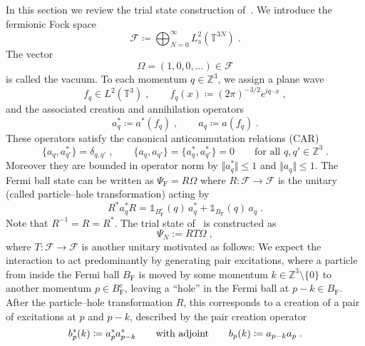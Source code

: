 \documentclass[12pt,a4paper]{article}
\numberwithin{equation}{section}
\newcommand{\cF}{\mathcal{F}}
\newcommand{\TTT}{\mathbb{T}}
\newcommand{\ZZZ}{\mathbb{Z}}
\newcommand{\1}{\mathbb{I}}
\newcommand{\F}{\mathrm{F}}
\newcommand{\FS}{\mathrm{F}}
\newcommand{\Z}{\mathbb{Z}}
\newcommand{\T}{\mathbb{T}}
\theoremstyle{plain}
\theoremstyle{definition}
\theoremstyle{remark}
\theoremstyle{plain}
\theoremstyle{definition}
\theoremstyle{remark}
\begin{document}
In this section we review the trial state construction of~\cite{CHN23}. We introduce the fermionic Fock space
\begin{equation}
	\cF \coloneq \bigoplus_{N=0}^\infty L^2_{\mathrm{a}}(\T^{3N}) \;.
\end{equation}
The vector
\begin{equation}
\Omega = (1,0,0,\ldots) \in \cF
\end{equation}
is called the vacuum. To each momentum $ q \in \ZZZ^3 $, we assign a plane wave
\begin{equation}
	f_q \in L^2(\TTT^3) \;, \qquad
	f_q(x) \coloneq (2 \pi)^{-3/2} e^{i q \cdot x} \;,
\end{equation}
and the associated creation and annihilation operators
\begin{equation}
	a^*_q \coloneq a^*(f_q) \;, \qquad
	a_q \coloneq a(f_q) \;.
\end{equation}
These operators satisfy the canonical anticommutation relations (CAR)
\begin{equation} \label{eq:CAR}
	\{a_q, a_{q'}^*\} = \delta_{q, q'} \;, \qquad
	\{a_q, a_{q'}\} = \{a_q^*, a_{q'}^*\} = 0 \qquad \text{for all } q, q' \in \ZZZ^3\;.
\end{equation}
Moreover they are bounded in operator norm by $ \Vert a_q^* \Vert \leq 1$ and $\Vert a_q \Vert \le 1 $.
The Fermi ball state can be written as $ \Psi_{\FS} = R \Omega $ where $ R: \cF \to \cF $ is the unitary (called particle--hole transformation) acting by
\begin{equation} \label{eq:R}
	R^* a_q^* R 	= \mathds{1}_{B_{\F}^c}(q) \, a_q^* 	+ \mathds{1}_{B_{\F}}(q) \, a_q \;.
\end{equation}
Note that $ R^{-1} = R = R^* $. The trial state of~\cite{CHN23} is constructed as
\begin{equation} \label{eq:Psitrial}
	\Psi_N := R T \Omega \;,
\end{equation}
where $ T: \cF \to \cF $ is another unitary motivated as follows: We expect the interaction to act predominantly by generating pair excitations, where a particle from inside the Fermi ball $ B_{\F} $ is moved by some momentum $ k \in \Z^3 \setminus \{ 0 \} $ to another momentum $ p \in B_{\F}^c $, leaving a ``hole'' in the Fermi ball at $ p-k \in B_{\F} $. After the particle--hole transformation $ R $, this corresponds to a creation of a pair of excitations at $ p $ and $ p-k $, described by the pair creation operator
\begin{equation} \label{eq:b}
	b^*_p(k) \coloneq a_p^* a_{p-k}^* 
	\qquad \textnormal{with adjoint} \qquad
	b_p(k) \coloneq a_{p-k} a_p \;.
\end{equation}
\end{document}
